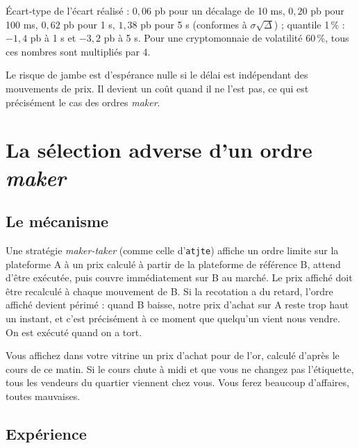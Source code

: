 \begin{codebox}
Écart-type de l'écart réalisé : $0{,}06$ pb pour un décalage de 10 ms, $0{,}20$ pb pour 100 ms, $0{,}62$ pb pour 1 s, $1{,}38$ pb pour 5 s (conformes à $\sigma\sqrt\Delta$) ; quantile 1\,\% : $-1{,}4$ pb à 1 s et $-3{,}2$ pb à 5 s. Pour une cryptomonnaie de volatilité 60\,\%, tous ces nombres sont multipliés par 4.
\end{codebox}

Le risque de jambe est d'espérance nulle si le délai est indépendant des mouvements de prix. Il devient un coût quand il ne l'est pas, ce qui est précisément le cas des ordres \emph{maker}.

\section{La sélection adverse d'un ordre \emph{maker}}

\subsection{Le mécanisme}

Une stratégie \emph{maker-taker} (comme celle d'\texttt{atjte}) affiche un ordre limite sur la plateforme A à un prix calculé à partir de la plateforme de référence B, attend d'être exécutée, puis couvre immédiatement sur B au marché. Le prix affiché doit être recalculé à chaque mouvement de B. Si la recotation a du retard, l'ordre affiché devient \og périmé\fg{} : quand B baisse, notre prix d'achat sur A reste trop haut un instant, et c'est précisément à ce moment que quelqu'un vient nous vendre. On est exécuté quand on a tort.

\begin{intuition}
Vous affichez dans votre vitrine un prix d'achat pour de l'or, calculé d'après le cours de ce matin. Si le cours chute à midi et que vous ne changez pas l'étiquette, tous les vendeurs du quartier viennent chez vous. Vous ferez beaucoup d'affaires, toutes mauvaises.
\end{intuition}

\subsection{Expérience}

